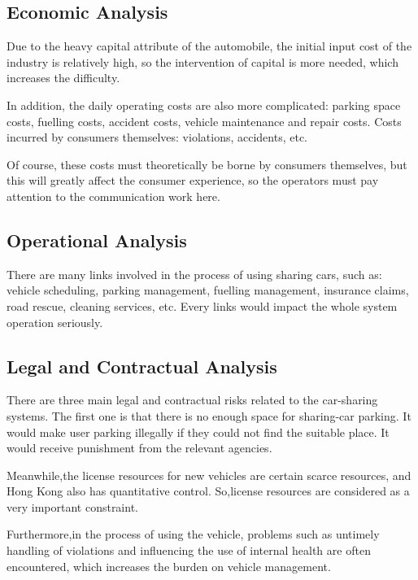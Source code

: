 \documentclass{article}
\begin{document}
    \subsection{Economic Analysis}
    
    Due to the heavy capital attribute of the automobile, the initial input cost of the industry is relatively high, so the intervention of capital is more needed, which increases the difficulty.
    
    In addition, the daily operating costs are also more complicated: parking space costs, fuelling costs, accident costs, vehicle maintenance and repair costs.
    Costs incurred by consumers themselves: violations, accidents, etc.
    
    Of course, these costs must theoretically be borne by consumers themselves, but this will greatly affect the consumer experience, so the operators must pay attention to the communication work here.
    
    \subsection{Operational Analysis}
    
    There are many links involved in the process of using sharing cars, such as: vehicle scheduling, parking management, fuelling management, insurance claims, road rescue, cleaning services, etc.
    Every links would impact the whole system operation seriously.
    
    \subsection{Legal and Contractual Analysis}
    
    There are three main legal and contractual risks related to the car-sharing systems.
    The first one is that there is no enough space for sharing-car parking.
    It would make user parking illegally if they could not find the suitable place.
    It would receive punishment from the relevant agencies.
    
    Meanwhile,the license resources for new vehicles are certain scarce resources, and Hong Kong also has quantitative control.
    So,license resources are considered as a very important constraint.
    
    Furthermore,in the process of using the vehicle, problems such as untimely handling of violations and influencing the use of internal health are often encountered, which increases the burden on vehicle management.
\end{document}
